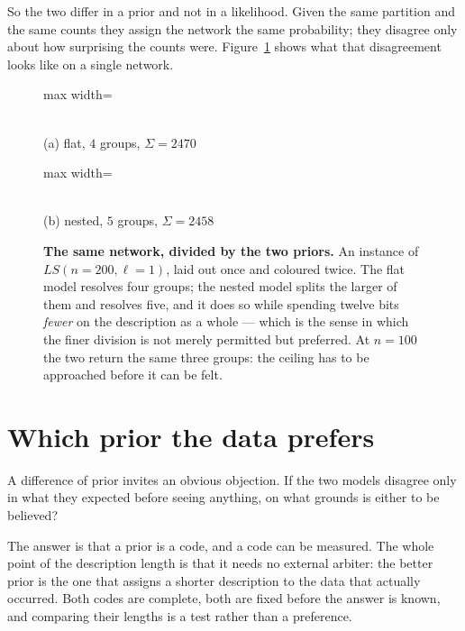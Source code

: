 So the two differ in a prior and not in a likelihood. Given the same partition and
the same counts they assign the network the same probability; they disagree only
about how surprising the counts were. Figure~\ref{fig:gr-flatnested} shows what
that disagreement looks like on a single network.

\begin{figure}[t]
\centering
\begin{minipage}{0.48\linewidth}\centering
\begin{adjustbox}{max width=\linewidth}\end{adjustbox}\\[2pt]
{\small (a) flat, $4$ groups, $\Sigma=2470$}
\end{minipage}\hfill
\begin{minipage}{0.48\linewidth}\centering
\begin{adjustbox}{max width=\linewidth}\end{adjustbox}\\[2pt]
{\small (b) nested, $5$ groups, $\Sigma=2458$}
\end{minipage}
\caption{\textbf{The same network, divided by the two priors.} An instance of
$LS(n{=}200,\ell{=}1)$, laid out once and coloured twice. The flat model resolves
four groups; the nested model splits the larger of them and resolves five, and it
does so while spending twelve bits \emph{fewer} on the description as a whole ---
which is the sense in which the finer division is not merely permitted but
preferred. At $n=100$ the two return the same three groups: the ceiling has to be
approached before it can be felt.}
\label{fig:gr-flatnested}
\end{figure}

\section{Which prior the data prefers}
\label{sec:gr-whichprior}

A difference of prior invites an obvious objection. If the two models disagree
only in what they expected before seeing anything, on what grounds is either to
be believed?

The answer is that a prior is a code, and a code can be measured. The whole point
of the description length is that it needs no external arbiter: the better prior
is the one that assigns a shorter description to the data that actually occurred.
Both codes are complete, both are fixed before the answer is known, and comparing
their lengths is a test rather than a preference.

